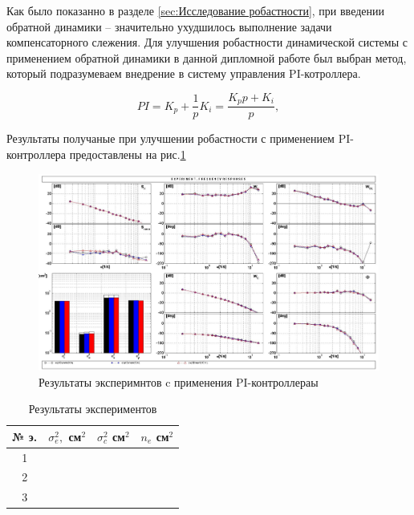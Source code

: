 Как было показанно в разделе \ref{sec:Исследование робастности}, при введении обратной динамики -- 
значительно ухудшилось выполнение задачи компенсаторного слежения. Для улучшения робастности динамической системы с применением обратной
динамики в данной дипломной работе был выбран метод, который подразумеваем внедрение в систему управления PI-котроллера.

\begin{equation}
    \label{eq:PI}
    PI = K_p + \frac{1}{p}K_i = \frac{K_p p + K_i}{p},
\end{equation}


Результаты получаные при улучшении робастности с применением PI-контроллера предоставлены на рис.\ref{fig:Модель с PI}

\begin{figure}[H]
    \centering \includegraphics[width=\linewidth]{Оглавление/Part3/figures/Модель с PI.jpg}
    \caption{Результаты эксперимнтов c применения PI-контроллераы}
    \label{fig:Модель с PI}
\end{figure}

\begin{table}[H]
    \caption{Результаты экспериментов}
    \centering
    \label{tab:Результаты экспериментов без PI}
    \begin{tabular}{|c|c|c|c|}
        \hline 
        № э.& $\sigma^2_e,$ см$^2$ & $\sigma^2_c$ см$^2$ & $n_e$ см$^2$ \\ \hline 
        1&  &  & \\ \hline
        2&  &  & \\ \hline
        3&  &  & \\ \hline

    \end{tabular}
\end{table}

